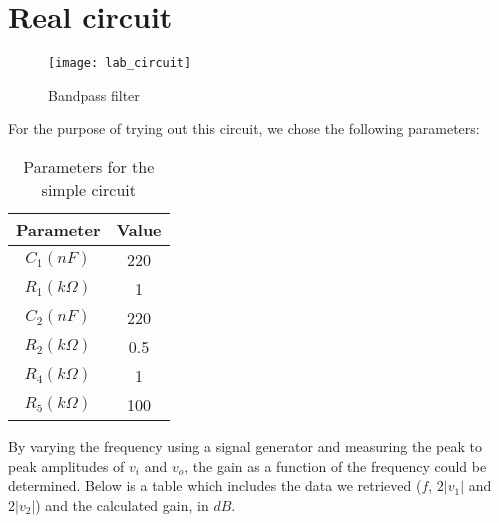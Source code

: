 \newpage

\section{Real circuit}
\label{sec:laboratory}

\begin{figure}[H]
\centering
\texttt{[image: lab\_circuit]}
\caption{Bandpass filter}
\label{circuit}
\end{figure}

For the purpose of trying out this circuit, we chose the following parameters:

\begin{table}[H]
\centering
\begin{tabular}{|c|c|}
        \hline
        Parameter & Value \\
        \hline
        $C_1 (nF)$ & 220 \\
        $R_1 (k\Omega)$ & 1 \\
        $C_2 (nF)$ & 220 \\
        $R_2 (k\Omega)$ & 0.5 \\
        $R_4 (k\Omega)$ & 1 \\
        $R_5 (k\Omega)$ & 100 \\
        \hline
\end{tabular}
\caption{Parameters for the simple circuit}
\label{simple_par}
\end{table}

By varying the frequency using a signal generator and measuring the peak to peak amplitudes of $v_i$ and $v_o$, the gain as a function of the frequency could be determined. Below is a table which includes the data we retrieved ($f$, $2|v_1|$ and $2|v_2|$) and the calculated gain, in $dB$.

